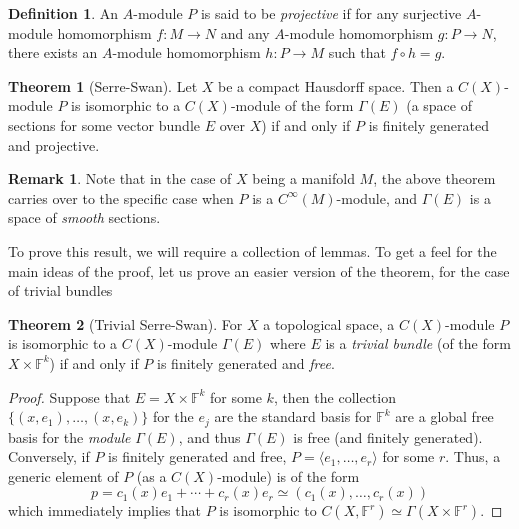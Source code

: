 \documentclass[aps,pra,showpacs,notitlepage,onecolumn,superscriptaddress,nofootinbib]{revtex4-1}
\theoremstyle{definition}
\newtheorem{definition}{Definition}[section]
\newtheorem{theorem}{Theorem}[section]
\newtheorem{remark}{Remark}[section]
\begin{document}
\begin{definition}
  An $A$-module $P$ is said to be \emph{projective} if for any surjective $A$-module homomorphism $f : M \rightarrow N$ and any $A$-module homomorphism $g : P \rightarrow N$,
  there exists an $A$-module homomorphism $h : P \rightarrow M$ such that $f \circ h = g$.
  \end{definition}

\begin{theorem}[Serre-Swan]
  Let $X$ be a compact Hausdorff space. Then a $C(X)$-module $P$ is isomorphic to a $C(X)$-module of the form $\Gamma(E)$ (a space of sections for some vector bundle $E$ over $X$) if and only if
  $P$ is finitely generated and projective.
\end{theorem}

\begin{remark}
  Note that in the case of $X$ being a manifold $M$, the above theorem carries over to the specific case when $P$ is a $C^{\infty}(M)$-module, and $\Gamma(E)$ is
  a space of \emph{smooth} sections.
\end{remark}

To prove this result, we will require a collection of lemmas. To get a feel for the main ideas of the proof, let us prove an easier version
of the theorem, for the case of trivial bundles

\begin{theorem}[Trivial Serre-Swan]
  For $X$ a topological space, a $C(X)$-module $P$ is isomorphic to a $C(X)$-module $\Gamma(E)$ where $E$ is a \emph{trivial bundle} (of the form $X \times \mathbb{F}^k$) if and only if
  $P$ is finitely generated and \emph{free}.
\end{theorem}

\begin{proof}
  Suppose that $E = X \times \mathbb{F}^{k}$ for some $k$, then the collection $\{(x, e_1), \dots, (x, e_k)\}$ for the $e_j$ are
  the standard basis for $\mathbb{F}^k$ are a global free basis for the \emph{module} $\Gamma(E)$, and thus $\Gamma(E)$ is free (and finitely generated).
  Conversely, if $P$ is finitely generated and free, $P = \langle e_1, \dots, e_r \rangle$ for some $r$. Thus, a generic element of $P$ (as a $C(X)$-module)
  is of the form
  \begin{equation}
    p = c_1(x) e_1 + \cdots + c_r(x) e_r \simeq (c_1(x), \dots, c_r(x))
  \end{equation}
  which immediately implies that $P$ is isomorphic to $C(X, \mathbb{F}^r) \simeq \Gamma(X \times \mathbb{F}^r)$.
\end{proof}
\end{document}
